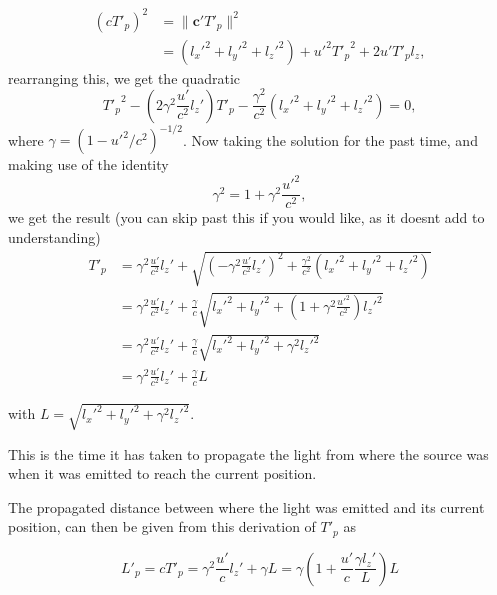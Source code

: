 \begin{derivation}
	\begin{equation}
		\begin{split}
			\left( c T'_{p}\right)^2 & = \|\mathbf{c'} T'_{p}\|^2                        \\
			                        & = (l_x'^2 + l_y'^2 + l_z'^2) + u'^2 {T'_{p}}^2 + 2u' T'_{p} l_z,
		\end{split}
	\end{equation}
	rearranging this, we get the quadratic
	\begin{equation}
		{T'_{p}}^{2} - \left(2\gamma^2\frac{u'}{c^2} l_z'\right)T'_{p} - \frac{\gamma^2}{c^2}(l_x'^2 + l_y'^2 + l_z'^2) = 0,
	\end{equation}
	where $\gamma = (1 - u'^2/c^2)^{-1/2}$. Now taking the solution for the past time, and making use of the identity
	\begin{equation}
		\gamma^2 = 1+\gamma^2\frac{u'^2}{c^2},
	\end{equation}
	we get the result (you can skip past this if you would like, as it doesnt add to understanding)
	\begin{equation}
		\begin{split}
			T'_{p} & = \gamma^2\frac{u'}{c^2} l_z' + \sqrt{\left(-\gamma^2\frac{u'}{c^2} l_z' \right)^2+\frac{\gamma^2}{c^2}(l_x'^2 + l_y'^2+ l_z'^2)} \\
			      & = \gamma^2\frac{u'}{c^2} l_z' + \frac{\gamma}{c}\sqrt{l_x'^2+ l_y'^2+\left(1+\gamma^2\frac{u'^2}{c^2}\right) l_z'^2}        \\
			      & = \gamma^2\frac{u'}{c^2} l_z' + \frac{\gamma}{c}\sqrt{l_x'^2 + l_y'^2+\gamma^2 l_z'^2}                                      \\
			      & = \gamma^2\frac{u'}{c^2} l_z' + \frac{\gamma}{c} L
		\end{split}
	\end{equation}

	with $ L=\sqrt{l_x'^2+l_y'^2+\gamma^2 l_z'^2}$.

	This is the time it has taken to propagate the light from where the source was when it was emitted to reach the current position.

\end{derivation}

The propagated distance between where the light was emitted and its current position, can then be given from this derivation of $T'_{p}$ as

\begin{equation}
	\label{eq: propagation distance}
	L'_{p} = cT'_{p} = \gamma^2 \frac{u'}{c} l_z' + \gamma  L = \gamma \left( 1 + \frac{u'}{c} \frac{\gamma l_z'}{L} \right) L
\end{equation}

